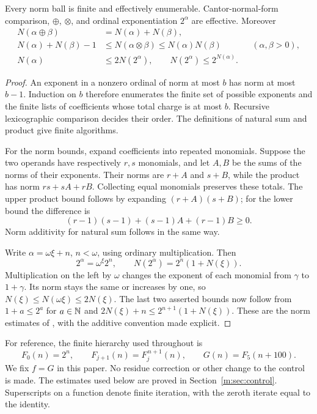 \begin{lemma}
\label{f:lem:norm-arithmetic}
Every norm ball is finite and effectively enumerable.  Cantor-normal-form
comparison, $\oplus$, $\otimes$, and ordinal exponentiation $2^\alpha$
are effective.  Moreover
\begin{align*}
 N(\alpha\oplus\beta)&=N(\alpha)+N(\beta),\\
 N(\alpha)+N(\beta)-1
 &\le N(\alpha\otimes\beta)\le N(\alpha)N(\beta)
       &&(\alpha,\beta>0),\\
 N(\alpha)&\le2N(2^\alpha),\qquad
 N(2^\alpha)\le2^{N(\alpha)}.
\end{align*}
\end{lemma}
\begin{proof}
An exponent in a nonzero ordinal of norm at most $b$ has norm at most
$b-1$.  Induction on $b$ therefore enumerates the finite set of possible
exponents and the finite lists of coefficients whose total charge is at
most $b$.  Recursive lexicographic comparison decides their order.
The definitions of natural sum and product give finite algorithms.

For the norm bounds, expand coefficients into repeated monomials.
Suppose the two operands have respectively $r,s$ monomials, and let
$A,B$ be the sums of the norms of their exponents.  Their norms are
$r+A$ and $s+B$, while the product has norm $rs+sA+rB$.
Collecting equal monomials preserves these totals.  The upper product
bound follows by expanding $(r+A)(s+B)$; for the lower bound the
difference is
\[
 (r-1)(s-1)+(s-1)A+(r-1)B\ge0.
\]
Norm additivity for natural sum follows in the same way.

Write $\alpha=\omega\xi+n$, $n<\omega$, using ordinary
multiplication.  Then
\[
 2^\alpha=\omega^\xi 2^n,\qquad
 N(2^\alpha)=2^n(1+N(\xi)).
\]
Multiplication on the left by $\omega$ changes the exponent of each
monomial from $\gamma$ to $1+\gamma$.  Its norm stays the same or
increases by one, so
$N(\xi)\le N(\omega\xi)\le2N(\xi)$.
The last two asserted bounds now follow from
$1+a\le2^a$ for $a\in\mathbb N$ and
$2N(\xi)+n\le2^{n+1}(1+N(\xi))$.
These are the norm estimates of \cite[Proposition~2.2]{ww}, with the
additive convention made explicit.
\end{proof}

For reference, the finite hierarchy used throughout is
\[
 F_0(n)=2^n,\qquad F_{j+1}(n)=F_j^{\,n+1}(n),\qquad
 G(n)=F_5(n+100).
\]
We fix $f=G$ in this paper.  No residue correction or other change to the
control is made.  The estimates used below are proved in
Section~\ref{m:sec:control}.  Superscripts on a function denote finite
iteration, with the zeroth iterate equal to the identity.


